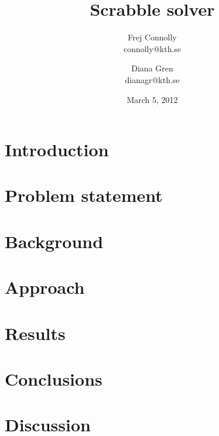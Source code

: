 \documentclass[a4paper, 12pt]{report}
\begin{document}
\title{Scrabble solver}
\date{March 5, 2012}
\author{Frej Connolly \\ connolly@kth.se
        \and Diana Gren \\ dianagr@kth.se}

\maketitle
\tableofcontents


\chapter{Introduction}

\chapter{Problem statement}
\chapter{Background}

\chapter{Approach}
\chapter{Results}
\chapter{Conclusions}
\chapter{Discussion}
\end{document}
